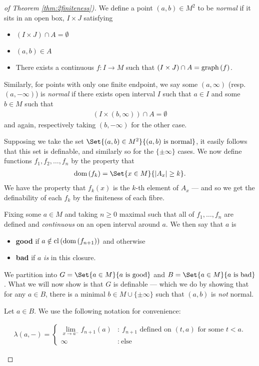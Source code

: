 \begin{proof}[of Theorem \ref{thm:2finiteness})]
	We define a point $(a, b) \in M^2$ to be \emph{normal} if it sits in an open box, $I \times J$ satisfying
	\begin{itemize}
		\item $(I \times J) \cap A = \emptyset$
		\item $(a, b) \in A$
		\item There exists a continuous $f \colon I \to M$ such that $(I \times J) \cap A = \operatorname{graph}\left(f\right)$.
	\end{itemize}

	Similarly, for points with only one finite endpoint, we say some $(a, \infty)$ (resp. $(a, - \infty)$) is \emph{normal} if there exists open interval $I$ such that $a \in I$ and some $b \in M$ such that
	\begin{align*}
		(I \times (b, \infty)) \cap A = \emptyset
	\end{align*}
	and again, respectively taking $(b, - \infty)$ for the other case.

	Supposing we take the set $\Set{(a, b) \in M^2}{(a, b) \ \textrm{is normal}}$, it easily follows that this set is definable, and similarly so for the $\{\pm \infty\}$ cases. We now define functions $f_1, f_2, \hdots, f_n$ by the property that
	\begin{align*}
		\dom{f_k} = \Set{x \in M}{\card{A_x} \geq k}.
	\end{align*}
	We have the property that $f_k(x)$ is the $k$-th element of $A_x$ — and so we get the definability of each $f_k$ by the finiteness of each fibre.

	Fixing some $a \in M$ and taking $n \geq 0$ maximal such that all of $f_1, \hdots, f_n$ are defined and \emph{continuous} on an open interval around $a$. We then say that $a$ is
	\begin{itemize}
		\item \textbf{good} if  $a \notin \operatorname{cl}\left(\operatorname{dom}\left(f_{n + 1}\right)\right)$ and otherwise
		\item \textbf{bad} if $a$ \emph{is} in this closure.
	\end{itemize}
	We partition into $G = \Set{a \in M}{a \ \textrm{is good}}$ and $B = \Set{a \in M}{a \ \textrm{is bad}}$. What we will now show is that $G$ is definable — which we do by showing that for any $a \in B$, there is a minimal $b \in M \cup \{\pm \infty \}$ such that $(a, b)$ is \emph{not} normal.

	Let $a \in B$. We use the following notation for convenience:
	\begin{description}
		\item
			\begin{align*}
						\lambda(a, -) = \begin{cases}
									      \displaystyle\lim_{x \to a^{-}} f_{n + 1}(a) & \colon \ \textrm{$f_{n+1}$ defined on $(t, a)$ for some $t < a$.} \\
									      \infty & \colon \ \textrm{else}
									   \end{cases}
			\end{align*}


\end{description}
\end{proof}
